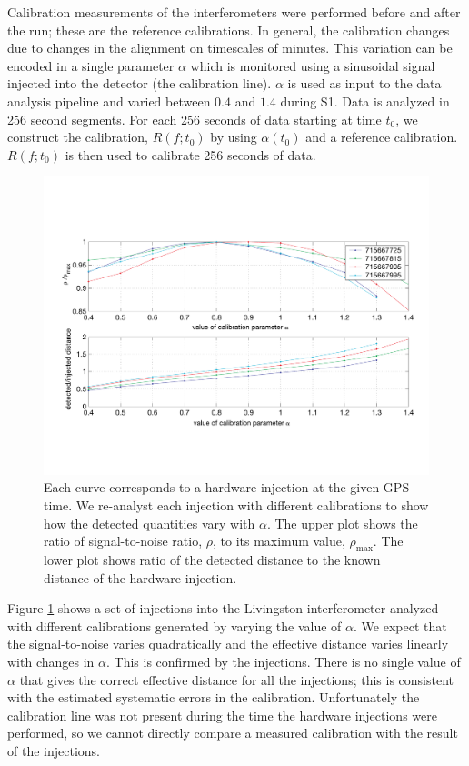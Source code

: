 Calibration measurements of the interferometers were performed before and
after the run; these are the reference calibrations. In general, the
calibration changes due to changes in the alignment on timescales of minutes.
This variation can be encoded in a single parameter $\alpha$ which is
monitored using a sinusoidal signal injected into the
detector (the calibration line)\cite{adhikari2003}. $\alpha$ is used as input
to the data analysis pipeline and varied between $0.4$ and $1.4$ during S1.
Data is analyzed in 256 second segments.  For each 256 seconds of data
starting at time $t_0$, we construct the calibration, $R(f;t_0)$ by using
$\alpha(t_0)$ and a reference calibration.  $R(f;t_0)$ is then used to
calibrate 256 seconds of data.

\begin{figure}[htb]
  \vspace{5pt}
  \begin{flushright}
    \includegraphics[width=\textwidth]{figures/hardware/calibration}    
  \end{flushright}
  \caption{%
  Each curve corresponds to a hardware injection at the given GPS time. We
  re-analyst each injection with different calibrations to show how the
  detected quantities vary with $\alpha$. The upper plot shows the ratio of
  signal-to-noise ratio, $\rho$, to its maximum value, $\rho_{\mathrm{max}}$.
  The lower plot shows ratio of the detected distance to the known distance of
  the hardware injection.
  }
\label{f:calibration}
\end{figure}
Figure \ref{f:calibration} shows a set of injections into the Livingston
interferometer analyzed with different calibrations generated by varying the
value of $\alpha$. We expect that the signal-to-noise varies quadratically and
the effective distance varies linearly with changes in $\alpha$\cite{bruce}.
This is confirmed by the injections.  There is no single value of $\alpha$
that gives the correct effective distance for all the injections; this is
consistent with the estimated systematic errors in the calibration.
Unfortunately the calibration line was not present during the time the
hardware injections were performed, so we cannot directly compare a measured
calibration with the result of the injections.

